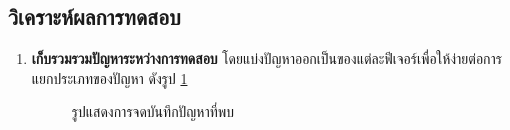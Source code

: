 \subsection{วิเคราะห์ผลการทดสอบ}
\begin{enumerate}
    \item \textbf{เก็บรวมรวมปัญหาระหว่างการทดสอบ} โดยแบ่งปัญหาออกเป็นของแต่ละฟีเจอร์เพื่อให้ง่ายต่อการแยกประเภทของปัญหา ดังรูป \ref{fig:GateringIssue}
          \begin{figure}[H]\centering
              \caption{รูปแสดงการจดบันทึกปัญหาที่พบ}\label{fig:GateringIssue}
          \end{figure}
          \begin{figure}[H]\centering

\end{figure}
\end{enumerate}
